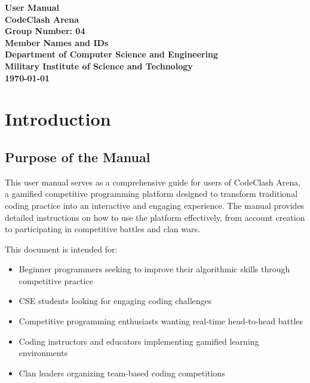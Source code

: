 \documentclass[12pt,a4paper]{article}
\begin{document}
\begin{titlepage}
\centering

\vspace*{2cm}

{\Huge \textbf{User Manual}}\\[0.5cm]
{\LARGE \textbf{CodeClash Arena}}\\[2cm]

\textbf{Group Number: 04}\\[0.5cm]
\textbf{Member Names and IDs}\\[3cm]

\textbf{Department of Computer Science and Engineering}\\
\textbf{Military Institute of Science and Technology}\\[1cm]

\textbf{\today}

\vfill
\end{titlepage}

\tableofcontents
\newpage

\section{Introduction}

\subsection{Purpose of the Manual}

This user manual serves as a comprehensive guide for users of CodeClash Arena, a gamified competitive programming platform designed to transform traditional coding practice into an interactive and engaging experience. The manual provides detailed instructions on how to use the platform effectively, from account creation to participating in competitive battles and clan wars.

This document is intended for:
\begin{itemize}
\item Beginner programmers seeking to improve their algorithmic skills through competitive practice
\item CSE students looking for engaging coding challenges
\item Competitive programming enthusiasts wanting real-time head-to-head battles
\item Coding instructors and educators implementing gamified learning environments
\item Clan leaders organizing team-based coding competitions
\end{itemize}
\end{document}
